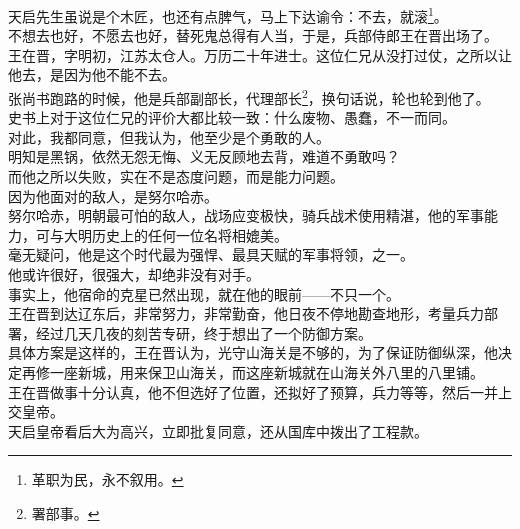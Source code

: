 \begin{multicols}{\theparacolNo}
天启先生虽说是个木匠，也还有点脾气，马上下达谕令：不去，就滚\footnote{革职为民，永不叙用。}。\\

不想去也好，不愿去也好，替死鬼总得有人当，于是，兵部侍郎王在晋出场了。\\

王在晋，字明初，江苏太仓人。万历二十年进士。这位仁兄从没打过仗，之所以让他去，是因为他不能不去。\\

张尚书跑路的时候，他是兵部副部长，代理部长\footnote{署部事。}，换句话说，轮也轮到他了。\\

史书上对于这位仁兄的评价大都比较一致：什么废物、愚蠢，不一而同。\\

对此，我都同意，但我认为，他至少是个勇敢的人。\\

明知是黑锅，依然无怨无悔、义无反顾地去背，难道不勇敢吗？\\

而他之所以失败，实在不是态度问题，而是能力问题。\\

因为他面对的敌人，是努尔哈赤。\\

努尔哈赤，明朝最可怕的敌人，战场应变极快，骑兵战术使用精湛，他的军事能力，可与大明历史上的任何一位名将相媲美。\\

毫无疑问，他是这个时代最为强悍、最具天赋的军事将领，之一。\\

他或许很好，很强大，却绝非没有对手。\\

事实上，他宿命的克星已然出现，就在他的眼前——不只一个。\\

王在晋到达辽东后，非常努力，非常勤奋，他日夜不停地勘查地形，考量兵力部署，经过几天几夜的刻苦专研，终于想出了一个防御方案。\\

具体方案是这样的，王在晋认为，光守山海关是不够的，为了保证防御纵深，他决定再修一座新城，用来保卫山海关，而这座新城就在山海关外八里的八里铺。\\

王在晋做事十分认真，他不但选好了位置，还拟好了预算，兵力等等，然后一并上交皇帝。\\

天启皇帝看后大为高兴，立即批复同意，还从国库中拨出了工程款。\\


\end{multicols}
